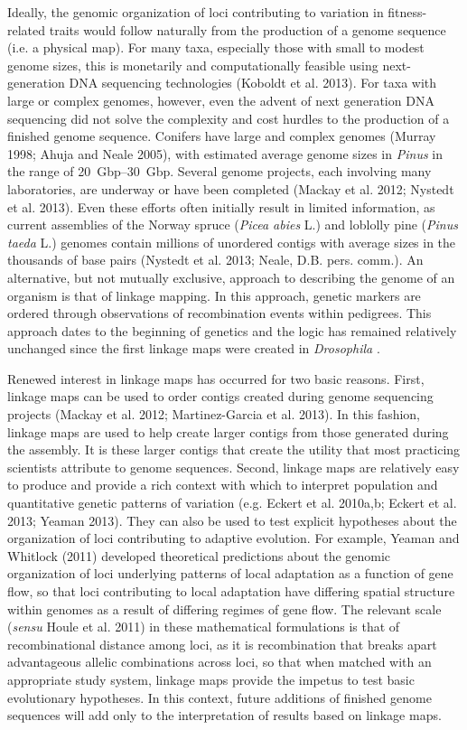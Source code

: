 \documentclass[11pt]{article}
\begin{document}
Ideally, the genomic organization of loci contributing to variation in fitness-related traits would follow 
naturally from the production of a genome sequence (i.e. a physical map). For many taxa, especially those with 
small to modest genome sizes, this is monetarily and computationally feasible using next-generation DNA sequencing 
technologies (Koboldt et al. 2013). For taxa with large or complex genomes, however, even the advent of next generation DNA 
sequencing did not solve the complexity and cost hurdles to the production of a finished genome sequence. Conifers have large and 
complex genomes (Murray 1998; Ahuja and Neale 2005), with estimated average genome sizes in \textit{Pinus} in the 
range of \SIrange{20}{30}{Gbp}. Several genome projects, each involving many laboratories, are underway or have been 
completed (Mackay et al. 2012; Nystedt et al. 2013). Even these efforts often initially result in limited information, 
as current assemblies of the Norway spruce (\textit{Picea abies} L.) and loblolly pine (\textit{Pinus taeda} L.) genomes 
contain millions of unordered contigs with average sizes in the thousands of base pairs (Nystedt et al. 2013; 
Neale, D.B. pers. comm.). An alternative, but not mutually exclusive, approach to describing the genome of an organism 
is that of linkage mapping. In this approach, genetic markers are ordered through observations of recombination events 
within pedigrees. This approach dates to the beginning of genetics and the logic has remained relatively unchanged 
since the first linkage maps were created in \textit{Drosophila} \citep{Sturtevant:1913}.

Renewed interest in linkage maps has occurred for two basic reasons. First, linkage maps can be used to order contigs 
created during genome sequencing projects (Mackay et al. 2012; Martinez-Garcia et al. 2013). In this fashion, linkage 
maps are used to help create larger contigs from those generated during the assembly. It is these larger contigs that 
create the utility that most practicing scientists attribute to genome sequences. Second, linkage maps are relatively 
easy to produce and provide a rich context with which to interpret population and quantitative genetic patterns of variation 
(e.g. Eckert et al. 2010a,b; Eckert et al. 2013; Yeaman 2013). They can also be used to test explicit hypotheses about 
the organization of loci contributing to adaptive evolution. For example, Yeaman and Whitlock (2011) developed theoretical 
predictions about the genomic organization of loci underlying patterns of local adaptation as a function of gene flow, 
so that loci contributing to local adaptation have differing spatial structure within genomes as a result of differing 
regimes of gene flow. The relevant scale (\textit{sensu} Houle et al. 2011) in these mathematical formulations is that 
of recombinational distance among loci, as it is recombination that breaks apart advantageous allelic combinations across 
loci, so that when matched with an appropriate study system, linkage maps provide the impetus to test basic evolutionary 
hypotheses. In this context, future additions of finished genome sequences will add only to the interpretation of 
results based on linkage maps.
\end{document}
